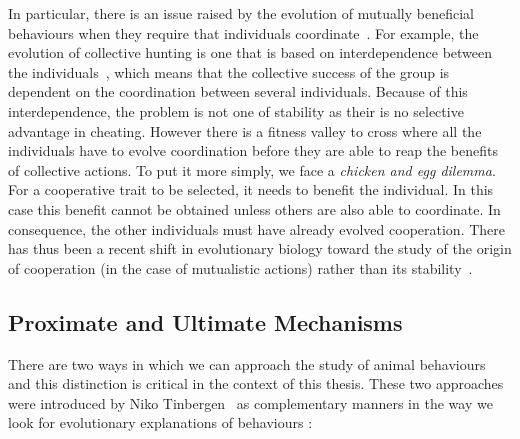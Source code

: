 

    In particular, there is an issue raised by the evolution of mutually beneficial behaviours when they require that individuals coordinate~\parencite{Alvard2001, Alvard2003, Leimar2003, Drea2009}. For example, the evolution of collective hunting is one that is based on interdependence between the individuals~\parencite{Tomasello2012}, which means that the collective success of the group is dependent on the coordination between several individuals. Because of this interdependence, the problem is not one of stability as their is no selective advantage in cheating. However there is a fitness valley to cross where all the individuals have to evolve coordination before they are able to reap the benefits of collective actions. To put it more simply, we face a \emph{chicken and egg dilemma}. For a cooperative trait to be selected, it needs to benefit the individual. In this case this benefit cannot be obtained unless others are also able to coordinate. In consequence, the other individuals must have already evolved cooperation. There has thus been a recent shift in evolutionary biology toward the study of the origin of cooperation (in the case of mutualistic actions) rather than its stability~\parencite{Forber2015}.


  \subsection{Proximate and Ultimate Mechanisms}

    There are two ways in which we can approach the study of animal behaviours and this distinction is critical in the context of this thesis. These two approaches were introduced by Niko Tinbergen~\parencite{Tinbergen1963, West2007a} as complementary manners in the way we look for evolutionary explanations of behaviours :

